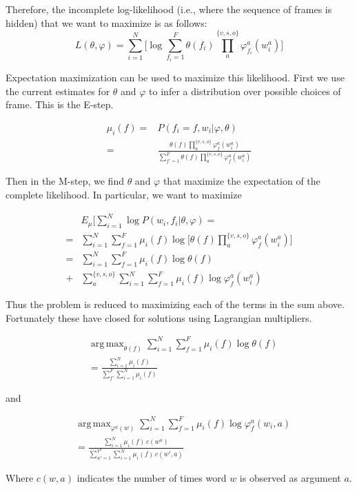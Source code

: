 \documentclass{article} %
\renewcommand\phi\varphi
\DeclareMathOperator*{\argmax}{arg\,max}
\begin{document}
Therefore, the incomplete log-likelihood (i.e., where the sequence of frames
is hidden) that we want to maximize is as follows:
\[
L(\theta,\phi) = \sum_{i=1}^N\big[\log \sum_{f_i=1}^F\theta(f_i)\prod_{a}^{\{v,s,o\}}\phi_{f_i}^a(w^a_i)\big]
\]

Expectation maximization can be used to maximize this likelihood.
First we use the current estimates for $\theta$ and $\phi$ to infer a 
distribution over possible choices of frame. This is the E-step. 

\begin{align}
\mu_i(f) =& P(f_i=f, w_i|\phi,\theta)\nonumber\\
=& \frac{\theta(f)\prod_a^{\{v,s,o\}}\phi_f^a(w^a_i)}
                {\sum_{f'=1}^F\theta(f)\prod_a^{\{v,s,o\}}\phi_f^a(w^a_i)}\label{E}
\end{align}

Then in the M-step, we find $\theta$ and $\phi$ that maximize the expectation of
the complete likelihood. In particular, we want to maximize

\begin{align*}
&E_\mu\big[\sum_{i=1}^N\log P(w_i,f_i|\theta,\phi) =\\
=& \sum_{i=1}^N\sum_{f=1}^F\mu_i(f)\log\Big[\theta(f)\prod_a^{\{v,s,o\}}\phi_f^a(w_i^a)\Big]\\
=& \sum_{i=1}^N\sum_{f=1}^F\mu_i(f)\log\theta(f)\\
+& \sum_a^{\{v,s,o\}} \sum_{i=1}^N\sum_{f=1}^F\mu_i(f)\log \phi_f^a(w_i^a)
\end{align*}

Thus the problem is reduced to maximizing each of the terms in the sum above. Fortunately
these have closed for solutions using Lagrangian multipliers.


\begin{align}
&\argmax_{\theta(f)}\sum_{i=1}^N\sum_{f=1}^F\mu_i(f)\log\theta(f)\nonumber\\
&= \frac{\sum_{i=1}^N\mu_i(f)}{\sum_{f'}^F\sum_{i=1}^N\mu_i(f)}
\end{align}

and

\begin{align}
&\argmax_{\phi^a(w)}\sum_{i=1}^N\sum_{f=1}^F\mu_i(f)\log \phi_f^a(w_i,a)\nonumber\\
&= \frac{\sum_{i=1}^N \mu_i(f)\,c(w^a)}{\sum_{w'=1}^{V^a}\sum_{i=1}^N \mu_i(f)\,c(w',a)}
\end{align}

Where $c(w,a)$ indicates the number of times word $w$ is observed as argument $a$.
\end{document}
